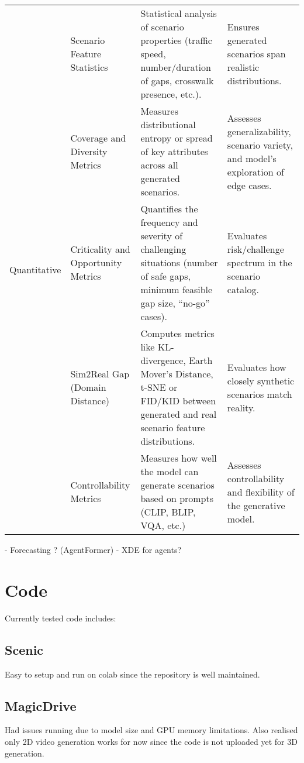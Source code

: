 \documentclass{article}
\begin{document}
\begin{table}[ht]
{\begin{tabular}{|p{2.5cm}|p{3.5cm}|p{6.2cm}|p{4.5cm}|}
\multirow{5}{*}{Quantitative}
& Scenario Feature Statistics & Statistical analysis of scenario properties (traffic speed, number/duration of gaps, crosswalk presence, etc.). & Ensures generated scenarios span realistic distributions. \\
\cline{2-4}
& Coverage and Diversity Metrics & Measures distributional entropy or spread of key attributes across all generated scenarios. & Assesses generalizability, scenario variety, and model's exploration of edge cases. \\
\cline{2-4}
& Criticality and Opportunity Metrics & Quantifies the frequency and severity of challenging situations (number of safe gaps, minimum feasible gap size, “no-go” cases). & Evaluates risk/challenge spectrum in the scenario catalog. \\
\cline{2-4}
& Sim2Real Gap (Domain Distance) & Computes metrics like KL-divergence, Earth Mover's Distance, t-SNE or FID/KID between generated and real scenario feature distributions. & Evaluates how closely synthetic scenarios match reality. \\
\cline{2-4}
& Controllability Metrics & Measures how well the model can generate scenarios based on prompts (CLIP, BLIP, VQA, etc.) & Assesses controllability and flexibility of the generative model. \\
\hline

\end{tabular}
}
\label{tab:validation}
\end{table}


- Forecasting ? (AgentFormer)
- XDE for agents?

\section{Code}

Currently tested code includes:

\subsection{Scenic}

Easy to setup and run on colab since the repository is well maintained.

\subsection{MagicDrive}

Had issues running due to model size and GPU memory limitations. Also realised only 2D video generation works for now since the code is not uploaded yet for 3D generation.
\end{document}
